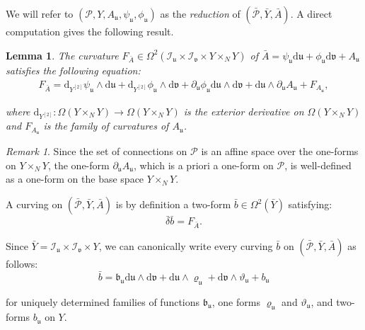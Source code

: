 \documentclass[10pt,a4paper,twoside,reqno]{amsart}
\theoremstyle{plain}
\newtheorem{lemma}[thm]{Lemma}
\theoremstyle{definition}
\theoremstyle{remark}
\newtheorem{remark}[thm]{Remark}
\def\dd{\mathrm{d}}
\def\cI{\mathcal{I}}
\def\cP{\mathcal{P}}
\def\cP{\mathcal{P}}
\def\dd{\mathrm{d}}
\def\fru{\mathfrak{u}}
\def\frv{\mathfrak{v}}
\begin{document}
\noindent
We will refer to $(\cP,Y, A_{\fru} , \psi_{\fru} ,\phi_{\fru})$ as the \emph{reduction} of $(\bar{\cP},\bar{Y},\bar{A})$. A direct computation gives the following result.

\begin{lemma}
\label{lemma:gerbecurvaturedecomposition}
The curvature $F_{\bar{A}} \in \Omega^2(\cI_{\fru}\times \cI_{\frv}  \times Y\times_{N} Y)$ of $\bar{A} = \psi_{\fru} \dd \fru + \phi_{\fru} \dd \frv + A_{\fru}$ satisfies the following equation:
\begin{eqnarray*}
F_{\bar{A}} = \dd_{Y^{[2]}} \psi_{\fru} \wedge \dd \fru + \dd_{Y^{[2]}} \phi_{\fru} \wedge \dd \frv + \partial_{\fru}\phi_{\fru} \dd\fru \wedge \dd\frv + \dd \fru \wedge \partial_{\fru} A_{\fru} + F_{A_{\fru}},
\end{eqnarray*}

\noindent
where $\dd_{Y^{[2]}}\colon \Omega(Y\times_{N} Y) \to \Omega(Y\times_{N} Y) $ is the exterior derivative on $\Omega(Y\times_{N} Y)$ and $F_{A_{\fru}}$ is the family of curvatures of $A_{\fru}$.
\end{lemma}

\begin{remark}
Since the set of connections on $\cP$ is an affine space over the one-forms on $Y\times_N Y$, the one-form $\partial_{\fru} A_{\fru}$, which is a priori a one-form on $\cP$, is well-defined as a one-form on the base space $Y\times_{N} Y$.
\end{remark}

\noindent
A curving on $(\bar{\cP},\bar{Y},\bar{A})$ is by definition a two-form $\bar{b}\in \Omega^2(\bar{Y})$ satisfying:
\begin{equation*}
\bar{\delta} \bar{b} = F_{\bar{A}}.
\end{equation*}

\noindent 
Since $\bar{Y} = \cI_{\fru}\times \cI_{\frv}  \times Y$, we can canonically write every curving $\bar{b}$ on $(\bar{\cP},\bar{Y},\bar{A})$ as follows:
\begin{equation}
\label{eq:decompositionbarb}
\bar{b} = \mathfrak{b}_{\fru} \dd \fru \wedge \dd \frv + \dd \fru \wedge \varrho_{\fru} + \dd \frv \wedge \vartheta_{\fru}   + b_{\fru}
\end{equation}

\noindent
for uniquely determined families of functions $\mathfrak{b}_{\fru}$, one forms $\varrho_{\fru}$ and $\vartheta_{\fru}$, and two-forms $b_{\fru}$ on $Y$.
\end{document}
